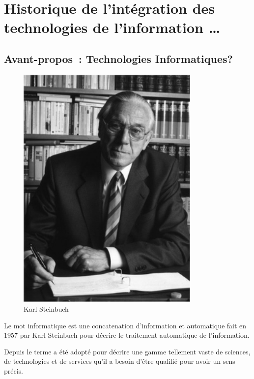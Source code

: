 
\part{Historique de l'intégration des technologies de l'information \ldots}\label{quoi}

\chapter*{Avant-propos~: Technologies \og{}Informatiques\fg{}?}

\begin{minipage}[H]{0.3\linewidth}
  \begin{figure}[H]
  \centering
  \includegraphics[width=0.8\textwidth]{../resources/illustrations/steinbuch}
  \caption{Karl Steinbuch}
  \end{figure}
\end{minipage}
\begin{minipage}[H]{0.7\linewidth}
Le mot \og{}informatique\fg{} est une concatenation d'\og{}information\fg{} et \og{}automatique\fg{} fait en 1957 par Karl Steinbuch\cite{steinbuch-2005} pour décrire le traitement automatique de l'information.

Depuis le terme a été adopté pour décrire une gamme tellement vaste de sciences, de technologies et de services qu'il a besoin d'être qualifié pour avoir un sens précis.
\vspace{1cm}
\end{minipage}

